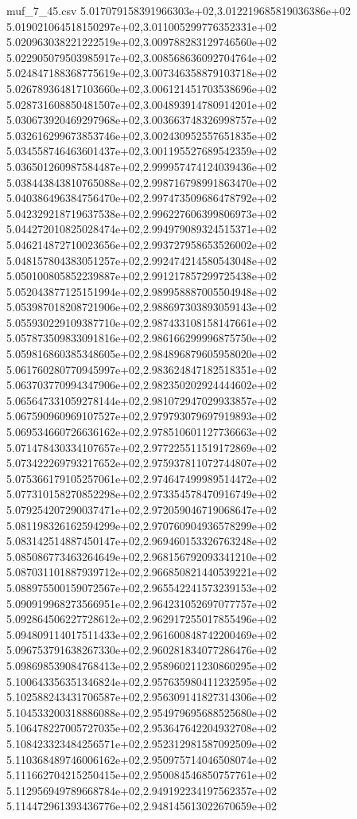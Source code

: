 \begin{filecontents*}{muf_7_45.csv}
5.017079158391966303e+02,3.012219685819036386e+02
5.019021064518150297e+02,3.011005299776352331e+02
5.020963038221222519e+02,3.009788283129746560e+02
5.022905079503985917e+02,3.008568636092704764e+02
5.024847188368775619e+02,3.007346358879103718e+02
5.026789364817103660e+02,3.006121451703538696e+02
5.028731608850481507e+02,3.004893914780914201e+02
5.030673920469297968e+02,3.003663748326998757e+02
5.032616299673853746e+02,3.002430952557651835e+02
5.034558746463601437e+02,3.001195527689542359e+02
5.036501260987584487e+02,2.999957474124039436e+02
5.038443843810765088e+02,2.998716798991863470e+02
5.040386496384756470e+02,2.997473509686478792e+02
5.042329218719637538e+02,2.996227606399806973e+02
5.044272010825028474e+02,2.994979089324515371e+02
5.046214872710023656e+02,2.993727958653526002e+02
5.048157804383051257e+02,2.992474214580543048e+02
5.050100805852239887e+02,2.991217857299725438e+02
5.052043877125151994e+02,2.989958887005504948e+02
5.053987018208721906e+02,2.988697303893059143e+02
5.055930229109387710e+02,2.987433108158147661e+02
5.057873509833091816e+02,2.986166299996875750e+02
5.059816860385348605e+02,2.984896879605958020e+02
5.061760280770945997e+02,2.983624847182518351e+02
5.063703770994347906e+02,2.982350202924444602e+02
5.065647331059278144e+02,2.981072947029933857e+02
5.067590960969107527e+02,2.979793079697919893e+02
5.069534660726636162e+02,2.978510601127736663e+02
5.071478430334107657e+02,2.977225511519172869e+02
5.073422269793217652e+02,2.975937811072744807e+02
5.075366179105257061e+02,2.974647499989514472e+02
5.077310158270852298e+02,2.973354578470916749e+02
5.079254207290037471e+02,2.972059046719068647e+02
5.081198326162594299e+02,2.970760904936578299e+02
5.083142514887450147e+02,2.969460153326763248e+02
5.085086773463264649e+02,2.968156792093341210e+02
5.087031101887939712e+02,2.966850821440539221e+02
5.088975500159072567e+02,2.965542241573239153e+02
5.090919968273566951e+02,2.964231052697077757e+02
5.092864506227728612e+02,2.962917255017855496e+02
5.094809114017511433e+02,2.961600848742200469e+02
5.096753791638267330e+02,2.960281834077286476e+02
5.098698539084768413e+02,2.958960211230860295e+02
5.100643356351346824e+02,2.957635980411232595e+02
5.102588243431706587e+02,2.956309141827314306e+02
5.104533200318886088e+02,2.954979695688525680e+02
5.106478227005727035e+02,2.953647642204932708e+02
5.108423323484256571e+02,2.952312981587092509e+02
5.110368489746006162e+02,2.950975714046508074e+02
5.111662704215250415e+02,2.950084546850757761e+02
5.112956949789668784e+02,2.949192234197562357e+02
5.114472961393436776e+02,2.948145613022670659e+02

\end{filecontents*}

